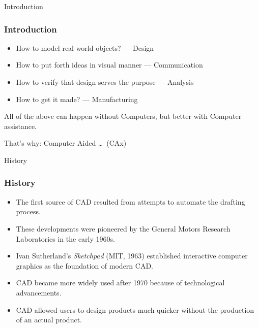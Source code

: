 \begin{frame}[fragile]{}
\begin{center}
{\Large Introduction}
\end{center}
\end{frame}

\begin{frame}[fragile]\frametitle{Introduction}
\begin{itemize}
\item How to model real world objects? --- Design
\item How to put forth ideas in visual manner --- Communication
\item How to verify that design serves the purpose --- Analysis
\item How to get it made? --- Manufacturing
\end{itemize}

All of the above can happen without Computers, but better with Computer assistance.

That's why: Computer Aided \ldots\ (CAx)
\end{frame}

\begin{frame}[fragile]{}
\begin{center}
{\Large History}
\end{center}
\end{frame}

\begin{frame}[fragile]\frametitle{History}
\begin{itemize}
\item The first source of CAD resulted from attempts to automate the drafting process.
\item These developments were pioneered by the General Motors Research Laboratories in the early 1960s.
\item Ivan Sutherland's \textit{Sketchpad} (MIT, 1963) established interactive computer graphics as the foundation of modern CAD.
\item CAD became more widely used after 1970 because of technological advancements.
\item CAD allowed users to design products much quicker without the production of an actual product.
\end{itemize}
\end{frame}

